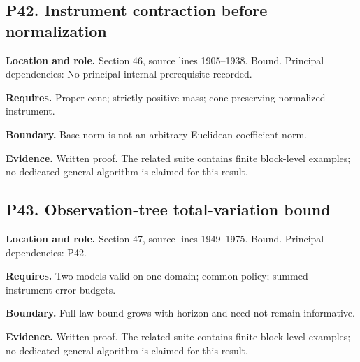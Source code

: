 \documentclass[11pt,oneside,openany]{book}
\numberwithin{equation}{section}
\begin{document}
\par\noindent\begin{minipage}{\textwidth}
\subsection{P42. Instrument contraction before
normalization}\label{LSMRegister:p42.-instrument-contraction-before-normalization}

\textbf{Location and role.} Section 46, source lines 1905--1938. Bound.
Principal dependencies: No principal internal prerequisite recorded.

\textbf{Requires.} Proper cone; strictly positive mass; cone-preserving
normalized instrument.

\textbf{Boundary.} Base norm is not an arbitrary Euclidean coefficient
norm.

\textbf{Evidence.} Written proof. The related suite contains finite
block-level examples; no dedicated general algorithm is claimed for this
result.
\end{minipage}\par\medskip

\par\noindent\begin{minipage}{\textwidth}
\subsection{P43. Observation-tree total-variation
bound}\label{LSMRegister:p43.-observation-tree-total-variation-bound}

\textbf{Location and role.} Section 47, source lines 1949--1975. Bound.
Principal dependencies: P42.

\textbf{Requires.} Two models valid on one domain; common policy; summed
instrument-error budgets.

\textbf{Boundary.} Full-law bound grows with horizon and need not remain
informative.

\textbf{Evidence.} Written proof. The related suite contains finite
block-level examples; no dedicated general algorithm is claimed for this
result.
\end{minipage}\par\medskip
\end{document}
